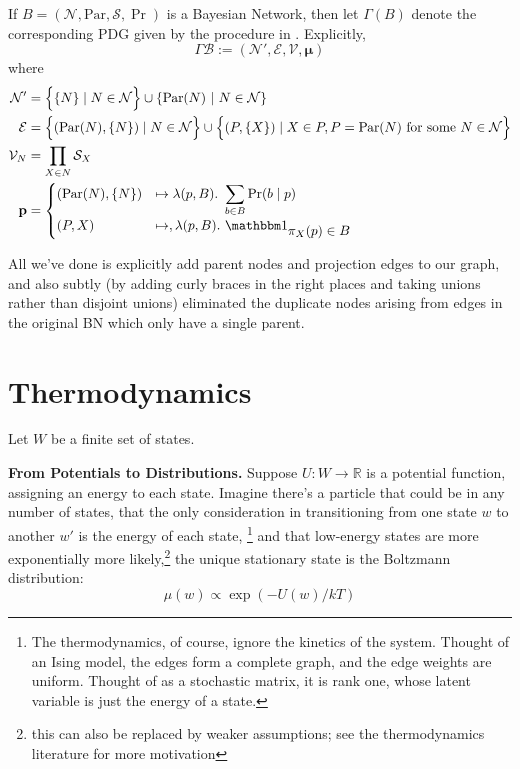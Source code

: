 \documentclass{article}
\newcommand{\bmu}{\boldsymbol{\mu}}
\newcommand{\Ed}{\mathcal E}
\numberwithin{equation}{section}
\begin{document}
	
	\begin{defn} \label{def:bnconvert-formal}
		If $B = (\mathcal N, \mathrm{Par}, \mathcal S, \Pr)$ is a Bayesian Network, then let $\Gamma (B)$ denote the corresponding PDG given by the procedure in . Explicitly, 
		\[ \Gamma\mathcal B :=  (\mathcal N', \Ed, \mathcal V, \bmu) \]
		where %
		\begin{align*}
		\mathcal N' &=  \left\{ \Big.\{N\} \mid N \in \mathcal N\right\} \cup \left\{ \mathrm{Par}(N) ~\middle|~ N \in \cal N \right\} \\%
		\Ed &= \left\{ \vphantom{\Big|}(\mathrm{Par}(N), \{N\}) \mid N \in \mathcal N \right\} \cup 
		\left\{\vphantom{\Big|} (P, \{X\}) \mid X \in P, P = \mathrm{Par}(N) \text{ for some }N \in \mathcal N \right\} \\
		\mathcal V_N &= \prod_{X \in N} \mathcal S_X \\
		\mathbf p &= \begin{cases}
		(\mathrm{Par}(N), \{N\}) &\mapsto \lambda(p, B).~ \displaystyle\sum_{b \in  B} \Pr(b \mid p) \\
		(P, X) &\mapsto, \lambda (p, B).~ \displaystyle \mathbbm 1_{\displaystyle\pi_X(p) \in B}
		\end{cases}
		\end{align*}
	\end{defn}
	All we've done is explicitly add parent nodes and projection edges to our graph, and also subtly (by adding curly braces in the right places and taking unions rather than disjoint unions) eliminated the duplicate nodes arising from edges in the original BN which only have a single parent.
	
	\section{Thermodynamics}\label{sec:thermo-background}
	Let $W$ be a finite set of states.
	
	\textbf{From Potentials to Distributions.}
	Suppose $U: W \to \mathbb R$ is a potential function, assigning an energy to each state. Imagine there's a particle that could be in any number of states, that the only consideration in transitioning from one state $w$ to another $w'$ is the energy of each state,%
		\footnote{The thermodynamics, of course, ignore the kinetics of the system. Thought of an Ising model, the edges form a complete graph, and the edge weights are uniform. Thought of as a stochastic matrix, it is rank one, whose latent variable is just the energy of a state.}
	and that low-energy states are more exponentially more likely,\footnote{this can also be replaced by weaker assumptions; see the thermodynamics literature for more motivation}
	the unique stationary state is the Boltzmann distribution:
	\begin{equation}
		 \mu(w) \propto \exp( - U(w) / kT ) \label{eq:boltzmann-appendix}
	\end{equation}
\end{document}
